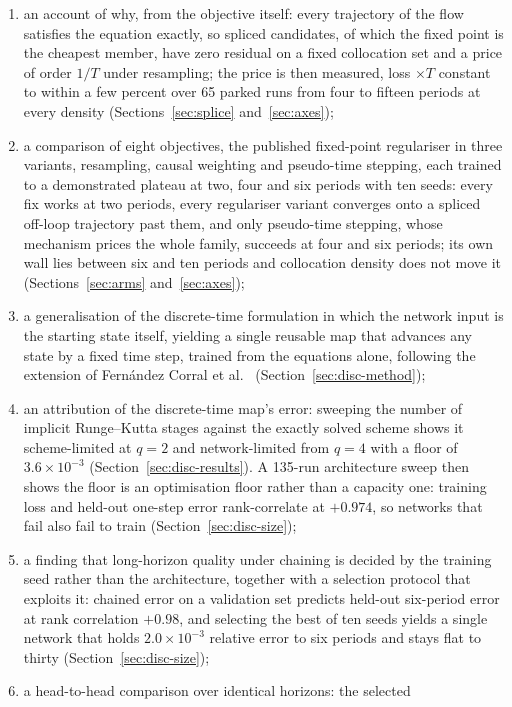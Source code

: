 \documentclass[11pt,a4paper]{article}
\begin{document}
\begin{enumerate}
  \item an account of why, from the objective itself: every trajectory of the flow satisfies the equation exactly, so spliced candidates, of which the fixed point is the cheapest member, have zero residual on a fixed collocation set and a price of order $1/T$ under resampling; the price is then measured, loss $\times T$ constant to within a few percent over 65 parked runs from four to fifteen periods at every density (Sections~\ref{sec:splice} and~\ref{sec:axes});
  \item a comparison of eight objectives, the published fixed-point regulariser in three variants, resampling, causal weighting and pseudo-time stepping, each trained to a demonstrated plateau at two, four and six periods with ten seeds: every fix works at two periods, every regulariser variant converges onto a spliced off-loop trajectory past them, and only pseudo-time stepping, whose mechanism prices the whole family, succeeds at four and six periods; its own wall lies between six and ten periods and collocation density does not move it (Sections~\ref{sec:arms} and~\ref{sec:axes});
  \item a generalisation of the discrete-time formulation in which the
  network input is the starting state itself, yielding a single reusable
  map that advances any state by a fixed time step, trained from the
  equations alone, following the extension of
  Fern\'andez Corral et al.~\cite{fernandez2024}
  (Section~\ref{sec:disc-method});
  \item an attribution of the discrete-time map's error: sweeping the
  number of implicit Runge--Kutta stages against the exactly solved scheme
  shows it scheme-limited at $q=2$ and network-limited from $q=4$ with a
  floor of $3.6\times10^{-3}$ (Section~\ref{sec:disc-results}). A 135-run
  architecture sweep then shows the floor is an optimisation floor rather
  than a capacity one: training loss and held-out one-step error
  rank-correlate at $+0.974$, so networks that fail also fail to train
  (Section~\ref{sec:disc-size});
  \item a finding that long-horizon quality under chaining is decided by
  the training seed rather than the architecture, together with a selection
  protocol that exploits it: chained error on a validation set predicts
  held-out six-period error at rank correlation $+0.98$, and selecting the
  best of ten seeds yields a single network that holds
  $2.0\times10^{-3}$ relative error to six periods and stays flat to
  thirty (Section~\ref{sec:disc-size});
  \item a head-to-head comparison over identical horizons: the selected

\end{enumerate}
\end{document}
